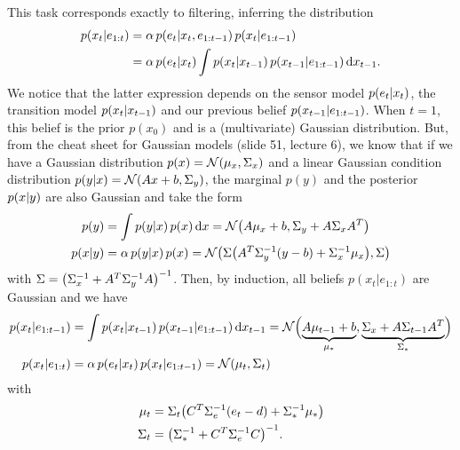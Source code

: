 \documentclass[11pt, a4paper]{article}
\begin{document}
\begin{enumerate}
    \begin{solution}
        This task corresponds exactly to filtering, \ie{} inferring the distribution
        \begin{align*}
            p(x_t \knowing e_{1:t}) & = \alpha \, p(e_t \knowing x_t, e_{1:t-1}) \, p(x_t \knowing e_{1:t-1}) \\
            & = \alpha \, p(e_t \knowing x_t) \int p(x_t \knowing x_{t-1}) \, p(x_{t-1} \knowing e_{1:t-1}) \d{x_{t-1}} .
        \end{align*}
        We notice that the latter expression depends on the sensor model $p(e_t \knowing x_t)$, the transition model $p(x_t \knowing x_{t-1})$ and our previous belief $p(x_{t-1} \knowing e_{1:t-1})$. When $t = 1$, this belief is the prior $p(x_0)$ and is a (multivariate) Gaussian distribution. But, from the cheat sheet for Gaussian models (slide 51, lecture 6), we know that if we have a Gaussian distribution $p(x) = \N(\mu_x, \Sigma_x)$ and a linear Gaussian condition distribution $p(y \knowing x) = \N(A x + b, \Sigma_y)$, the marginal $p(y)$ and the posterior $p(x \knowing y)$ are also Gaussian and take the form
        \begin{align*}
            p(y) & = \int p(y \knowing x) \, p(x) \d{x} = \N\rbk*{A \mu_x + b, \Sigma_y + A \Sigma_x A^T} \\
            p(x \knowing y) & = \alpha \, p(y \knowing x) \, p(x) = \N\rbk*{\Sigma \rbk*{A^T \Sigma_y^{-1} (y - b) + \Sigma_x^{-1} \mu_x}, \Sigma}
        \end{align*}
        with $\Sigma = \rbk*{\Sigma_x^{-1} + A^T \Sigma_y^{-1} A}^{-1}$. Then, by induction, all beliefs $p(x_t | e_{1:t})$ are Gaussian and we have
        \begin{align*}
            p(x_t | e_{1:t-1}) & = \int p(x_t \knowing x_{t-1}) \, p(x_{t-1} \knowing e_{1:t-1}) \d{x_{t-1}} = \N\rbk[\Big]{\underbrace{A \mu_{t-1} + b}_{\mu_*}, \underbrace{\Sigma_x + A \Sigma_{t-1} A^T}_{\Sigma_*}} \\
            p(x_t \knowing e_{1:t}) & =  \alpha \, p(e_t \knowing x_t) \, p(x_t \knowing e_{1:t-1}) = \N(\mu_t, \Sigma_t)
        \end{align*}
        with
        \begin{align*}
            \mu_t & = \Sigma_t \rbk*{C^T \Sigma_e^{-1} (e_t - d) + \Sigma_*^{-1} \mu_*} \\
            \Sigma_t & = \rbk*{\Sigma_*^{-1} + C^T \Sigma_e^{-1} C}^{-1} .
        \end{align*}
    \end{solution}


\end{enumerate}
\end{document}
